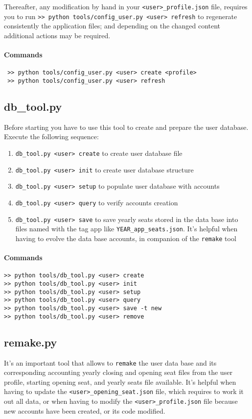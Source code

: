 \documentclass[12pt, a4paper]{article}
\begin{document}
Thereafter, any modification by hand in your \verb!<user>_profile.json! file, requires you  to run \verb!>> python tools/config_user.py <user> refresh! to regenerate consistently the application files; and depending on the changed content additional actions may be required. 
 
 \paragraph{Commands}
 \begin{verbatim}
 >> python tools/config_user.py <user> create <profile> 
 >> python tools/config_user.py <user> refresh
 \end{verbatim}
 \subsection{db\_tool.py}
 Before starting you have to use this tool to create and prepare the user database. 
 Execute the following sequence:
 \begin{enumerate}[wide, labelwidth=!, labelindent=0pt]
 \item \verb!db_tool.py <user> create! to create user database file
 \item \verb!db_tool.py <user> init! to create user database structure		
 \item \verb!db_tool.py <user> setup!	 to populate user database with accounts
 \item \verb!db_tool.py <user> query! to verify accounts creation
 \item \verb!db_tool.py <user> save! to save yearly seats stored in the data base into files named with the tag \textsf{app} like \verb!YEAR_app_seats.json!. It's helpful when having to evolve the data base accounts, in companion of the \verb!remake! tool
\end{enumerate}
\paragraph{Commands}
\begin{verbatim}
>> python tools/db_tool.py <user> create
>> python tools/db_tool.py <user> init
>> python tools/db_tool.py <user> setup
>> python tools/db_tool.py <user> query
>> python tools/db_tool.py <user> save -t new
>> python tools/db_tool.py <user> remove
\end{verbatim}

\subsection{remake.py}
It's an important tool that allows to \verb!remake! the user data base and its corresponding accounting yearly closing and opening seat files from the user profile, starting opening seat, and yearly seats file available.
It's helpful when having to update the \verb!<user>_opening_seat.json! file, which requires to work it out all data, or when having to modify the \verb!<user>_profile.json! file because new accounts have been created, or its code modified.
\end{document}
